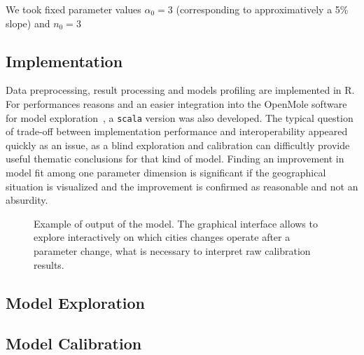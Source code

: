 \documentclass[Royal,sageh,times]{sagej}
\begin{document}
We took fixed parameter values $\alpha_0 = 3$ (corresponding to approximatively a 5\% slope) and $n_0 = 3$



\subsection{Implementation}

Data preprocessing, result processing and models profiling are implemented in R. For performances reasons and an easier integration into the OpenMole software for model exploration~\cite{reuillon2013openmole}, a \texttt{scala} version was also developed. The typical question of trade-off between implementation performance and interoperability appeared quickly as an issue, as a blind exploration and calibration can difficultly provide useful thematic conclusions for that kind of model. Finding an improvement in model fit among one parameter dimension is significant if the geographical situation is visualized and the improvement is confirmed as reasonable and not an absurdity.


\begin{figure}
\centering
\caption{Example of output of the model. The graphical interface allows to explore interactively on which cities changes operate after a parameter change, what is necessary to interpret raw calibration results.}
\end{figure}




\subsection{Model Exploration}




\subsection{Model Calibration}

\end{document}
